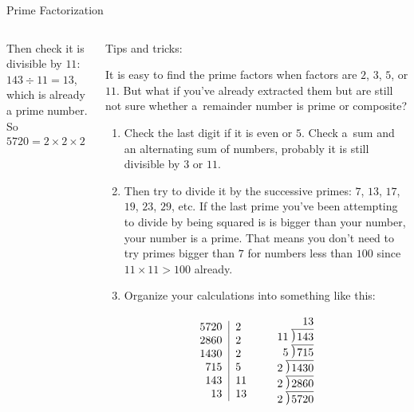 \documentclass[9pt,aspectratio=169]{beamer}
\newcommand\Mydiv[2]{%
$\strut#1$\kern.25em\smash{\raise.3ex\hbox{$\big)$}}$\mkern-8mu
        \overline{\enspace\strut#2}$}
\begin{document}
\begin{frame}{Prime Factorization}
\begin{columns}[T]
\begin{column}{0.5\textwidth}
{      Then check it is divisible by $11$: $143 \div 11 = 13$, which is already a prime number. So}
      \[ 5720 = 2 \times 2 \times 2 \times 5 \times 11 \times 13 = 2^3 \times 5 \times 11 \times 13.\]
    \end{column}
    \begin{column}{0.5\textwidth}
      {\color{textBlue} Tips and tricks:}
      {\small
      It is easy to find the prime factors when factors are $2$, $3$, $5$, or $11$. But what if you've already extracted them but are still not sure whether a~remainder number is prime or composite?
      \begin{enumerate}
        \item Check the last digit if it is even or $5$. Check a~sum and an alternating sum of numbers, probably it is still divisible by $3$ or $11$.
        \item Then try to divide it by the successive primes: $7$, $13$, $17$, $19$, $23$, $29$, etc. If the last prime you've been attempting to divide by being squared is is bigger than your number, your number is a prime. That means you don't need to try primes bigger than $7$ for numbers less than $100$ since $11 \times 11 > 100$ already.
        \item Organize your calculations into something like this:
      \end{enumerate}\vspace*{-0.5ex}
      \[
        \begin{tabular}{c c}
          \begin{tabular}{r|l}
            5720 & 2 \\
            2860 & 2 \\
            1430 & 2 \\
             715 & 5 \\
             143 & 11 \\
              13 & 13 \\
          \end{tabular} 
          &
          \begin{tabular}{r}
            13\\\
            \Mydiv{11}{143}\\
            \Mydiv{5}{715}\\
            \Mydiv{2}{1430}\\
            \Mydiv{2}{2860}\\
            \Mydiv{2}{5720}
          \end{tabular}
        \end{tabular}
      \]
      }
    \end{column}
  \end{columns}
\end{frame}
\end{document}
